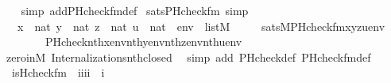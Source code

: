 \begin{isabellebody}
%
\isadelimproof
\ \ %
\endisadelimproof
%
\isatagproof
{}\isamarkupfalse%
\ {\isacharparenleft}{\kern0pt}simp\ add{\isacharcolon}{\kern0pt}PHcheck{\isacharunderscore}{\kern0pt}fm{\isacharunderscore}{\kern0pt}def{\isacharparenright}{\kern0pt}%
\endisatagproof
{\isafoldproof}%
%
\isadelimproof
\isanewline
%
\endisadelimproof
\isanewline
{}\isamarkupfalse%
\ sats{\isacharunderscore}{\kern0pt}PHcheck{\isacharunderscore}{\kern0pt}fm\ {\isacharbrackleft}{\kern0pt}simp{\isacharbrackright}{\kern0pt}{\isacharcolon}{\kern0pt}\isanewline
\ \ {\isachardoublequoteopen}{\isasymlbrakk}\ x\ {\isasymin}\ nat{\isacharsemicolon}{\kern0pt}\ y\ {\isasymin}\ nat{\isacharsemicolon}{\kern0pt}\ z\ {\isasymin}\ nat{\isacharsemicolon}{\kern0pt}\ u\ {\isasymin}\ nat\ {\isacharsemicolon}{\kern0pt}\ env\ {\isasymin}\ list{\isacharparenleft}{\kern0pt}M{\isacharparenright}{\kern0pt}{\isasymrbrakk}\isanewline
\ \ \ \ {\isasymLongrightarrow}\ sats{\isacharparenleft}{\kern0pt}M{\isacharcomma}{\kern0pt}PHcheck{\isacharunderscore}{\kern0pt}fm{\isacharparenleft}{\kern0pt}x{\isacharcomma}{\kern0pt}y{\isacharcomma}{\kern0pt}z{\isacharcomma}{\kern0pt}u{\isacharparenright}{\kern0pt}{\isacharcomma}{\kern0pt}env{\isacharparenright}{\kern0pt}\ {\isasymlongleftrightarrow}\isanewline
\ \ \ \ \ \ \ \ PHcheck{\isacharparenleft}{\kern0pt}nth{\isacharparenleft}{\kern0pt}x{\isacharcomma}{\kern0pt}env{\isacharparenright}{\kern0pt}{\isacharcomma}{\kern0pt}nth{\isacharparenleft}{\kern0pt}y{\isacharcomma}{\kern0pt}env{\isacharparenright}{\kern0pt}{\isacharcomma}{\kern0pt}nth{\isacharparenleft}{\kern0pt}z{\isacharcomma}{\kern0pt}env{\isacharparenright}{\kern0pt}{\isacharcomma}{\kern0pt}nth{\isacharparenleft}{\kern0pt}u{\isacharcomma}{\kern0pt}env{\isacharparenright}{\kern0pt}{\isacharparenright}{\kern0pt}{\isachardoublequoteclose}\isanewline
%
\isadelimproof
\ \ %
\endisadelimproof
%
\isatagproof
{}\isamarkupfalse%
\ zero{\isacharunderscore}{\kern0pt}in{\isacharunderscore}{\kern0pt}M\ Internalizations{\isachardot}{\kern0pt}nth{\isacharunderscore}{\kern0pt}closed\ \isamarkupfalse%
\ {\isacharparenleft}{\kern0pt}simp\ add{\isacharcolon}{\kern0pt}\ PHcheck{\isacharunderscore}{\kern0pt}def\ PHcheck{\isacharunderscore}{\kern0pt}fm{\isacharunderscore}{\kern0pt}def{\isacharparenright}{\kern0pt}%
\endisatagproof
{\isafoldproof}%
%
\isadelimproof
\isanewline
%
\endisadelimproof
\isanewline
\isanewline
{}\isamarkupfalse%
\isanewline
\ \ is{\isacharunderscore}{\kern0pt}Hcheck{\isacharunderscore}{\kern0pt}fm\ {\isacharcolon}{\kern0pt}{\isacharcolon}{\kern0pt}\ {\isachardoublequoteopen}{\isacharbrackleft}{\kern0pt}i{\isacharcomma}{\kern0pt}i{\isacharcomma}{\kern0pt}i{\isacharcomma}{\kern0pt}i{\isacharbrackright}{\kern0pt}\ {\isasymRightarrow}\ i{\isachardoublequoteclose}\ \isanewline

\end{isabellebody}
